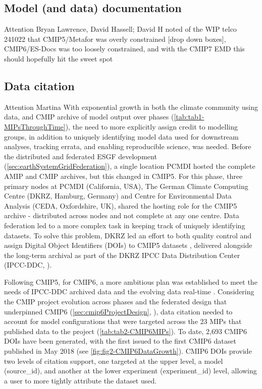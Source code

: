 \documentclass[gmd, preprint]{copernicus}
\def\cred#1{{\color{red}#1}}
\begin{document}
\subsection{Model (and data) documentation}
\cred{Attention Bryan Lawrence, David Hassell; David H noted of the WIP telco 241022 that CMIP5/Metafor \citep{guilyardi_cmip5_2011} was overly constrained [drop down boxes], CMIP6/ES-Docs \citep{pascoe_documenting_2020} was too loosely constrained, and with the CMIP7 EMD this should hopefully hit the sweet spot}


\subsection{Data citation}
\cred{Attention Martina}
With exponential growth in both the climate community using data, and CMIP archive of model output over phases (\autoref{tab:tab1-MIPsThroughTime}), the need to more explicitly assign credit to modelling groups, in addition to uniquely identifying model data used for downstream analyses, tracking errata, and enabling reproducible science, was needed. Before the distributed and federated ESGF development (\autoref{sec:earthSystemGridFederation}), a single location PCMDI hosted the complete AMIP and CMIP archives, but this changed in CMIP5. For this phase, three primary nodes at PCMDI (California, USA), The German Climate Computing Centre (DKRZ, Hamburg, Germany) and Centre for Environmental Data Analysis (CEDA, Oxfordshire, UK), shared the hosting role for the CMIP5 archive - distributed across nodes and not complete at any one centre. Data federation led to a more complex task in keeping track of uniquely identifying datasets. To solve this problem, DKRZ led an effort to both quality control and assign Digital Object Identifiers (DOIs) to CMIP5 datasets \citep{stockhause_quality_2012, stockhause_cmip6_2017}, delivered alongside the long-term archival as part of the DKRZ IPCC Data Distribution Center (IPCC-DDC, \citet{stockhause_twenty-five_2022}).

Following CMIP5, for CMIP6, a more ambitious plan was established to meet the needs of IPCC-DDC archived data and the evolving data real-time \citep{stockhause_cmip6_2017}. Considering the CMIP project evolution across phases and the federated design that underpinned CMIP6 (\autoref{sec:cmip6ProjectDesign}, \citet{eyring_overview_2016}), data citation needed to account for model configurations that were targeted across the 23 MIPs that published data to the project (\autoref{tab:tab2-CMIP6MIPs}). To date, 2,693 CMIP6 DOIs have been generated, with the first issued to the first CMIP6 dataset published in May 2018 (see \autoref{fig:fig2-CMIP6DataGrowth}). CMIP6 DOIs provide two levels of citation support, one targeted at the upper level, a model (source\_id), and another at the lower experiment (experiment\_id) level, allowing a user to more tightly attribute the dataset used.
\end{document}
